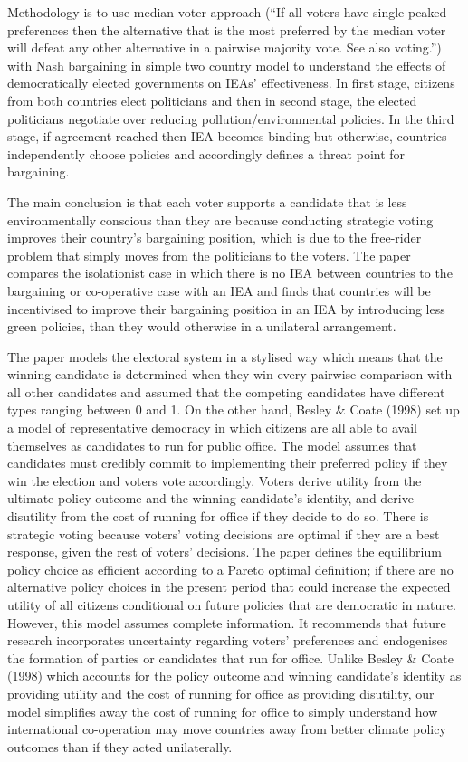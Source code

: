 \documentclass[11pt,preprint, authoryear]{elsarticle}
\numberwithin{equation}{section}
\numberwithin{figure}{section}
\numberwithin{table}{section}
\begin{document}
Methodology is to use median-voter approach (``If all voters have
single-peaked preferences then the alternative that is the most
preferred by the median voter will defeat any other alternative in a
pairwise majority vote. See also voting.'') with Nash bargaining in
simple two country model to understand the effects of democratically
elected governments on IEAs' effectiveness. In first stage, citizens
from both countries elect politicians and then in second stage, the
elected politicians negotiate over reducing pollution/environmental
policies. In the third stage, if agreement reached then IEA becomes
binding but otherwise, countries independently choose policies and
accordingly defines a threat point for bargaining.

The main conclusion is that each voter supports a candidate that is less
environmentally conscious than they are because conducting strategic
voting improves their country's bargaining position, which is due to the
free-rider problem that simply moves from the politicians to the voters.
The paper compares the isolationist case in which there is no IEA
between countries to the bargaining or co-operative case with an IEA and
finds that countries will be incentivised to improve their bargaining
position in an IEA by introducing less green policies, than they would
otherwise in a unilateral arrangement.

The paper models the electoral system in a stylised way which means that
the winning candidate is determined when they win every pairwise
comparison with all other candidates and assumed that the competing
candidates have different types ranging between 0 and 1. On the other
hand, Besley \& Coate (1998) set up a model of representative democracy
in which citizens are all able to avail themselves as candidates to run
for public office. The model assumes that candidates must credibly
commit to implementing their preferred policy if they win the election
and voters vote accordingly. Voters derive utility from the ultimate
policy outcome and the winning candidate's identity, and derive
disutility from the cost of running for office if they decide to do so.
There is strategic voting because voters' voting decisions are optimal
if they are a best response, given the rest of voters' decisions. The
paper defines the equilibrium policy choice as efficient according to a
Pareto optimal definition; if there are no alternative policy choices in
the present period that could increase the expected utility of all
citizens conditional on future policies that are democratic in nature.
However, this model assumes complete information. It recommends that
future research incorporates uncertainty regarding voters' preferences
and endogenises the formation of parties or candidates that run for
office. Unlike Besley \& Coate (1998) which accounts for the policy
outcome and winning candidate's identity as providing utility and the
cost of running for office as providing disutility, our model simplifies
away the cost of running for office to simply understand how
international co-operation may move countries away from better climate
policy outcomes than if they acted unilaterally.
\end{document}
